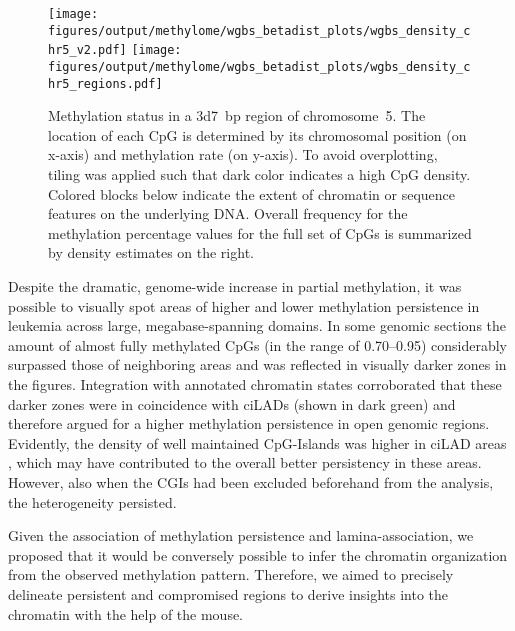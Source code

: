 \begin{figure}[!bht]
	\centering
	\texttt{[image: figures/output/methylome/wgbs\_betadist\_plots/wgbs\_density\_chr5\_v2.pdf]}
	\texttt{[image: figures/output/methylome/wgbs\_betadist\_plots/wgbs\_density\_chr5\_regions.pdf]} 
	\caption[Methylation status within an annotated sample region on chr5]{Methylation status in a \SI{3d7}{bp} region of chromosome~5. The location of each CpG is determined by its chromosomal position (on x-axis) and methylation rate (on y-axis). To avoid overplotting, tiling was applied such that dark color indicates a high CpG density. Colored blocks below indicate the extent of chromatin or sequence features on the underlying DNA. Overall frequency for the methylation percentage values for the full set of CpGs is summarized by density estimates on the right.}
	\label{fig:wgbs_density_chr5}
\end{figure}

Despite the dramatic, genome-wide increase in partial methylation, it was possible to visually spot areas of higher and lower methylation persistence in leukemia across large, megabase-spanning domains. In some genomic sections the amount of almost fully methylated CpGs (in the range of \numrange{0.70}{0.95}) considerably surpassed those of neighboring areas and was reflected in visually darker zones in the figures. Integration with annotated chromatin states\cite{Meuleman2013} corroborated that these darker zones were in coincidence with ciLADs (shown in dark green) and therefore argued for a higher methylation persistence in open genomic regions. Evidently, the density of well maintained CpG-Islands  was higher in ciLAD areas , which may have contributed to the overall better persistency in these areas. However, also when the CGIs had been excluded beforehand from the analysis, the heterogeneity persisted.

Given the association of methylation persistence and lamina-association,  we proposed that it would be conversely possible to infer the chromatin organization from the observed methylation pattern. Therefore, we aimed to precisely delineate persistent and compromised regions to derive insights into the \mllafnine chromatin with the help of the \dnmtchip mouse. 


